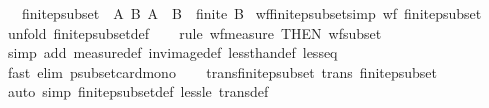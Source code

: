 \begin{isabellebody}
\ \ \ {\isachardoublequoteopen}finite{\isacharunderscore}{\kern0pt}psubset\ {\isacharequal}{\kern0pt}\ {\isacharbraceleft}{\kern0pt}{\isacharparenleft}{\kern0pt}A{\isacharcomma}{\kern0pt}\ B{\isacharparenright}{\kern0pt}{\isachardot}{\kern0pt}\ A\ {\isasymsubset}\ B\ {\isasymand}\ finite\ B{\isacharbraceright}{\kern0pt}{\isachardoublequoteclose}\isanewline
\isanewline
{}\isamarkupfalse%
\ wf{\isacharunderscore}{\kern0pt}finite{\isacharunderscore}{\kern0pt}psubset{\isacharbrackleft}{\kern0pt}simp{\isacharbrackright}{\kern0pt}{\isacharcolon}{\kern0pt}\ {\isachardoublequoteopen}wf\ finite{\isacharunderscore}{\kern0pt}psubset{\isachardoublequoteclose}\isanewline
%
\isadelimproof
\ \ %
\endisadelimproof
%
\isatagproof
{}\isamarkupfalse%
\ {\isacharparenleft}{\kern0pt}unfold\ finite{\isacharunderscore}{\kern0pt}psubset{\isacharunderscore}{\kern0pt}def{\isacharparenright}{\kern0pt}\isanewline
\ \ \isamarkupfalse%
\ {\isacharparenleft}{\kern0pt}rule\ wf{\isacharunderscore}{\kern0pt}measure\ {\isacharbrackleft}{\kern0pt}THEN\ wf{\isacharunderscore}{\kern0pt}subset{\isacharbrackright}{\kern0pt}{\isacharparenright}{\kern0pt}\isanewline
\ \ \isamarkupfalse%
\ {\isacharparenleft}{\kern0pt}simp\ add{\isacharcolon}{\kern0pt}\ measure{\isacharunderscore}{\kern0pt}def\ inv{\isacharunderscore}{\kern0pt}image{\isacharunderscore}{\kern0pt}def\ less{\isacharunderscore}{\kern0pt}than{\isacharunderscore}{\kern0pt}def\ less{\isacharunderscore}{\kern0pt}eq{\isacharparenright}{\kern0pt}\isanewline
\ \ \isamarkupfalse%
\ {\isacharparenleft}{\kern0pt}fast\ elim{\isacharbang}{\kern0pt}{\isacharcolon}{\kern0pt}\ psubset{\isacharunderscore}{\kern0pt}card{\isacharunderscore}{\kern0pt}mono{\isacharparenright}{\kern0pt}\isanewline
\ \ \isamarkupfalse%
%
\endisatagproof
{\isafoldproof}%
%
\isadelimproof
\isanewline
%
\endisadelimproof
\isanewline
{}\isamarkupfalse%
\ trans{\isacharunderscore}{\kern0pt}finite{\isacharunderscore}{\kern0pt}psubset{\isacharcolon}{\kern0pt}\ {\isachardoublequoteopen}trans\ finite{\isacharunderscore}{\kern0pt}psubset{\isachardoublequoteclose}\isanewline
%
\isadelimproof
\ \ %
\endisadelimproof
%
\isatagproof
{}\isamarkupfalse%
\ {\isacharparenleft}{\kern0pt}auto\ simp{\isacharcolon}{\kern0pt}\ finite{\isacharunderscore}{\kern0pt}psubset{\isacharunderscore}{\kern0pt}def\ less{\isacharunderscore}{\kern0pt}le\ trans{\isacharunderscore}{\kern0pt}def{\isacharparenright}{\kern0pt}%
\endisatagproof
{\isafoldproof}%
%
\isadelimproof

\end{isabellebody}
